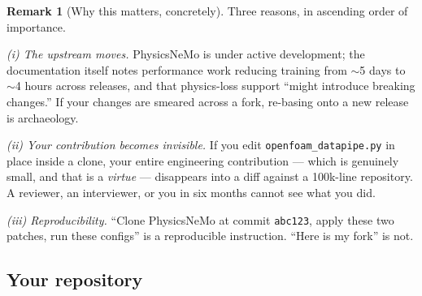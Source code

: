 \documentclass[10pt,a4paper]{article}
\theoremstyle{definition}
\newtheorem{remark}{Remark}[section]
\begin{document}
\begin{remark}[Why this matters, concretely]
\label{rem:twolevel}
Three reasons, in ascending order of importance.

\emph{(i) The upstream moves.} PhysicsNeMo is under active development; the
documentation itself notes performance work reducing training from $\sim$5 days to
$\sim$4 hours across releases, and that physics-loss support ``might introduce
breaking changes.'' If your changes are smeared across a fork, re-basing onto a new
release is archaeology.

\emph{(ii) Your contribution becomes invisible.} If you edit
\texttt{openfoam\_datapipe.py} in place inside a clone, your entire engineering
contribution --- which is genuinely small, and that is a \emph{virtue} --- disappears
into a diff against a 100k-line repository. A reviewer, an interviewer, or you in six
months cannot see what you did.

\emph{(iii) Reproducibility.} ``Clone PhysicsNeMo at commit \texttt{abc123}, apply
these two patches, run these configs'' is a reproducible instruction. ``Here is my
fork'' is not.
\end{remark}

\subsection{Your repository}
\end{document}
